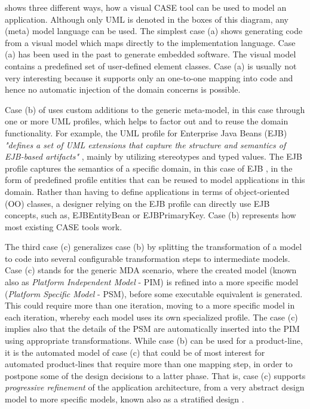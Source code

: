  shows three different ways, how a visual CASE tool can be used to model an application. Although only UML \cite{www.uml} is denoted in the boxes of this diagram, any (meta) model language can be used. The simplest case (a) shows generating code from a visual model which maps directly to the implementation language. Case (a) has been used in the past to generate embedded software. The visual model contains a predefined set of user-defined element classes. Case (a) is usually not very interesting because it supports only an one-to-one mapping into code and hence no automatic injection of the domain concerns is possible.

Case (b) of  uses custom additions to the generic meta-model, in this case through one or more UML profiles, which helps to factor out and to reuse the domain functionality. For example, the UML profile for Enterprise Java Beans (EJB) \cite{www.uml.ejb,www.uml.ejb.omg} \textit{"defines a set of UML extensions that capture the structure and semantics of EJB-based artifacts"} \cite{www.uml.ejb}, mainly by utilizing stereotypes and typed values. The EJB profile captures the semantics of a specific domain, in this case of EJB \cite{ejb21}, in the form of predefined profile entities that can be reused to model applications in this domain. Rather than having to define applications in terms of object-oriented (OO) classes, a designer relying on the EJB profile can directly use EJB concepts, such as, \flqq{}EJBEntityBean\frqq{} or  \flqq{}EJBPrimaryKey\frqq{}. Case (b) represents how most existing CASE tools work.

The third case (c) generalizes case (b) by splitting the transformation of a model to code into several configurable transformation steps to intermediate models. Case (c) stands for the generic MDA scenario, where the created model (known also as \textit{Platform Independent Model} - PIM) is refined into a more specific model (\textit{Platform Specific Model} - PSM), before some executable equivalent is generated. This could require more than one iteration, moving to a more specific model in each iteration, whereby each model uses its own specialized profile. The case (c) implies also that the details of the PSM are automatically inserted into the PIM using appropriate transformations. While case (b) can be used for a product-line, it is the automated model of case (c) that could be of most interest for automated product-lines that require more than one mapping step, in order to postpone some of the design decisions to a latter phase. That is, case (c) supports \textit{progressive refinement} \cite{sf.04} of the application architecture, from a very abstract design model to more specific models, known also as a stratified design \cite{kuhne.03,kuhne.01}. %

